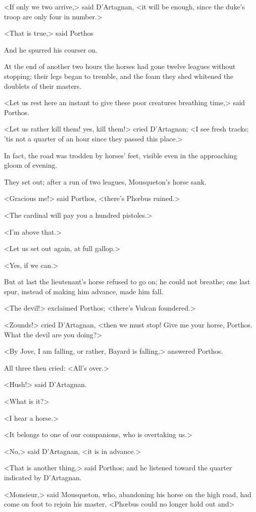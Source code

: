 <If only we two arrive,> said D'Artagnan, <it will be enough, since the duke's troop are only four in number.>

<That is true,> said Porthos

And he spurred his courser on.

At the end of another two hours the horses had gone twelve leagues without stopping; their legs began to tremble, and the foam they shed whitened the doublets of their masters.

<Let us rest here an instant to give these poor creatures breathing time,> said Porthos.

<Let us rather kill them! yes, kill them!> cried D'Artagnan; <I see fresh tracks; 'tis not a quarter of an hour since they passed this place.>

In fact, the road was trodden by horses' feet, visible even in the approaching gloom of evening.

They set out; after a run of two leagues, Mousqueton's horse sank.

<Gracious me!> said Porthos, <there's Phœbus ruined.>

<The cardinal will pay you a hundred pistoles.>

<I'm above that.>

<Let us set out again, at full gallop.>

<Yes, if we can.>

But at last the lieutenant's horse refused to go on; he could not breathe; one last spur, instead of making him advance, made him fall.

<The devil!> exclaimed Porthos; <there's Vulcan foundered.>

<Zounds!> cried D'Artagnan, <then we must stop! Give me your horse, Porthos. What the devil are you doing?>

<By Jove, I am falling, or rather, Bayard is falling,> answered Porthos.

All three then cried: <All's over.>

<Hush!> said D'Artagnan.

<What is it?>

<I hear a horse.>

<It belongs to one of our companions, who is overtaking us.>

<No,> said D'Artagnan, <it is in advance.>

<That is another thing,> said Porthos; and he listened toward the quarter indicated by D'Artagnan.

<Monsieur,> said Mousqueton, who, abandoning his horse on the high road, had come on foot to rejoin his master, <Phœbus could no longer hold out and\longdash>

